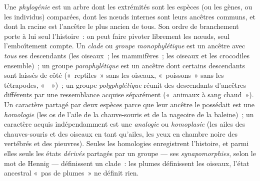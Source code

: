 \begin{definition}\label{def:b2:phylogenetic-trees:tree}
Une \emph{phylogénie} est un arbre dont les extrémités sont les espèces
(ou les gènes, ou les individus) comparées, dont les nœuds internes sont
leurs ancêtres communs, et dont la racine est l'ancêtre le plus ancien de
tous. Son ordre de branchement porte à lui seul l'histoire~: on peut faire
pivoter librement les nœuds, seul l'emboîtement compte. Un \emph{clade} ou
\emph{groupe monophylétique} est un ancêtre avec \emph{tous} ses
descendants (les oiseaux~; les mammifères~; les oiseaux et les crocodiles
ensemble)~; un groupe \emph{paraphylétique} est un ancêtre dont certains
descendants sont laissés de côté («~reptiles~» sans les oiseaux,
«~poissons~» sans les tétrapodes, «~~»)~; un groupe
\emph{polyphylétique} réunit des descendants d'ancêtres différents par
une ressemblance acquise séparément («~animaux à sang chaud~»). Un
caractère partagé par deux espèces parce que leur ancêtre le possédait
est une \emph{homologie} (les os de l'aile de la chauve-souris et de la
nageoire de la baleine)~; un caractère acquis indépendamment est une
\emph{analogie} ou \emph{homoplasie} (les ailes des chauves-souris et des
oiseaux en tant qu'ailes, les yeux en chambre noire des vertébrés et des
pieuvres). Seules les homologies enregistrent l'histoire, et parmi elles
seuls les états \emph{dérivés} partagés par un groupe --- ses
\emph{synapomorphies}, selon le mot de Hennig --- définissent un clade~:
les plumes définissent les oiseaux, l'état ancestral «~pas de plumes~» ne
définit rien.
\end{definition}


